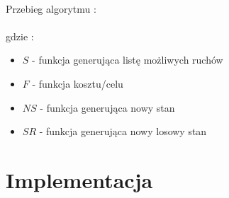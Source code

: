 \documentclass[wide,a4paper,titlepage,12pt] {article}
\begin{document}
\newpage
\paragraph{}
Przebieg algorytmu :
\lstset{ %
    language=java,                %
    basicstyle=\scriptsize,       %
    numbers=left,                   %
    numberstyle=\scriptsize,      %
    stepnumber=10,                   %
    numbersep=9pt,                  %
    showspaces=false,               %
    showstringspaces=false,         %
    showtabs=false,                 %
    breaklines=true,                %
    }
    
    \paragraph{}
    gdzie : 
    \begin{itemize}
        \item $S$ - funkcja generująca listę możliwych ruchów
        \item $F$ - funkcja kosztu/celu
        \item $NS$ - funkcja generująca nowy stan
        \item $SR$ - funkcja generująca nowy losowy stan
    \end{itemize}
\newpage
\section{Implementacja}
\end{document}
